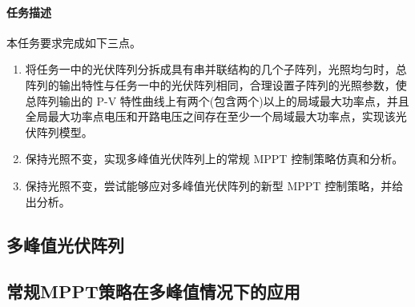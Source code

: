 \documentclass[a4paper,12pt]{article}
\begin{document}
    \paragraph{任务描述} %
    本任务要求完成如下三点。
    \begin{enumerate}[noitemsep,topsep=0pt]
    \item 将任务一中的光伏阵列分拆成具有串并联结构的几个子阵列，光照均匀时，总阵列的输出特性与任务一中的光伏阵列相同，合理设置子阵列的光照参数，使总阵列输出的 P-V 特性曲线上有两个(包含两个)以上的局域最大功率点，并且全局最大功率点电压和开路电压之间存在至少一个局域最大功率点，实现该光伏阵列模型。
    \item 保持光照不变，实现多峰值光伏阵列上的常规 MPPT 控制策略仿真和分析。
    \item 保持光照不变，尝试能够应对多峰值光伏阵列的新型 MPPT 控制策略，并给出分析。
    \end{enumerate}    
    \subsection{多峰值光伏阵列} %
    \label{sub:多峰值光伏阵列}
    
    \subsection{常规MPPT策略在多峰值情况下的应用} %
    \label{sub:常规mppt策略在多峰值情况下的应用}
    
\end{document}
